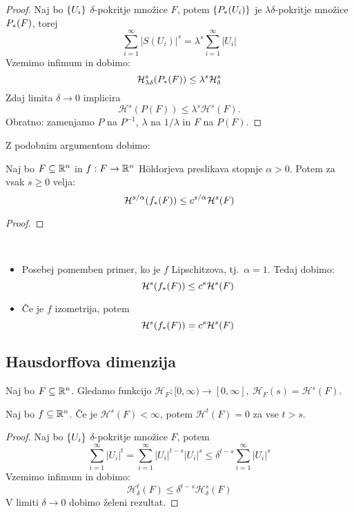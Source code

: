 \begin{proof}
    Naj bo \(\left\{U_i\right\}\) \(\delta\)-pokritje množice \(F\), potem \(\left\{P_{*}(U_i)\right\}\) je \(\lambda \delta\)-pokritje množice \(P_{*}(F)\), torej 
    \[\sum_{i=1}^{\infty} |S(U_i)|^s = \lambda^s \sum_{i=1}^{\infty}|U_i|\]
    Vzemimo infimum in dobimo:
    \[\mathcal{H}^s_{\lambda \delta} (P_{*}(F)) \leq \lambda^s \mathcal{H}^s_{\delta}\]
    Zdaj limita \(\delta \to 0\) implicira 
    \[\mathcal{H}^s(P(F)) \leq \lambda^s \mathcal{H}^s(F).\]
    Obratno: zamenjamo \(P\) na \(P^{-1}\), \(\lambda\) na \(1/\lambda\) in \(F\) na \(P(F)\).
\end{proof}

Z podobnim argumentom dobimo:
\begin{trditev}
    Naj bo \(F \subseteq \mathbb{R}^n\) in \(f: F \to \mathbb{R}^n\) Höldorjeva preslikava stopnje \(\alpha > 0\). Potem za vsak \(s \geq 0\) velja:
    \[\mathcal{H}^{s/\alpha}(f_{*}(F)) \leq c^{s/\alpha} \mathcal{H}^s(F)\]
\end{trditev}

\begin{proof}
    \todo{}
\end{proof}

\begin{opomba} \
    \begin{itemize}
        \item Posebej pomemben primer, ko je \(f\) Lipschitzova, tj.\ \(\alpha = 1\). Tedaj dobimo:
        \[\mathcal{H}^{s}(f_{*}(F)) \leq c^{s} \mathcal{H}^s(F)\]
        \item Če je \(f\) izometrija, potem 
        \[\mathcal{H}^{s}(f_{*}(F)) = c^{s} \mathcal{H}^s(F)\]
    \end{itemize}
\end{opomba}

\subsection{Hausdorffova dimenzija}
Naj bo \(F \subseteq \mathbb{R}^n\). Gledamo funkcijo \(\mathcal{H}_F: [0, \infty) \to [0, \infty], \ \mathcal{H}_F(s) = \mathcal{H}^{s}(F)\).

\begin{lema}
    Naj bo \(f \subseteq \mathbb{R}^n\). Če je \(\mathcal{H}^{s}(F) < \infty\), potem \(\mathcal{H}^{t}(F) = 0\) za vse \(t > s\).
\end{lema}

\begin{proof}
    Naj bo \(\left\{U_i\right\}\) \(\delta\)-pokritje množice \(F\), potem 
    \[\sum_{i=1}^{\infty} |U_i|^t = \sum_{i=1}^{\infty}|U_i|^{t-s}|U_i|^s \leq \delta^{t-s} \sum_{i=1}^{\infty}|U_i|^s\]
    Vzemimo infimum in dobimo:
    \[\mathcal{H}^{t}_\delta(F) \leq \delta^{t-s}\mathcal{H}^{s}_\delta(F)\]
    V limiti \(\delta \to 0\) dobimo želeni rezultat.
\end{proof}

